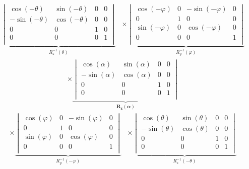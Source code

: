 \documentclass[a4paper]{article}
\theoremstyle{hangindent}
\theoremstyle{hangindent}
\begin{document}
\begin{align*}
    \underbrace{
        \begin{vmatrix}
            \cos(-\theta)  & \sin(-\theta) & 0 & 0 \\
            -\sin(-\theta) & \cos(-\theta) & 0 & 0 \\
            0              & 0             & 1 & 0 \\
            0              & 0             & 0 & 1 \\
        \end{vmatrix}
    }_{R^{-1}_z(\theta)}
    &
    \times
    \underbrace{
        \begin{vmatrix}
            \cos(-\varphi) & 0 & -\sin(-\varphi) & 0 \\
            0              & 1 & 0               & 0 \\
            \sin(-\varphi) & 0 & \cos(-\varphi)  & 0 \\
            0              & 0 & 0               & 1 \\
        \end{vmatrix}
    }_{R^{-1}_y(\varphi)}
\end{align*}
\begin{align*}
    \times
    \underbrace{
        \begin{vmatrix}
            \cos(\alpha)  & \sin(\alpha) & 0 & 0 \\
            -\sin(\alpha) & \cos(\alpha) & 0 & 0 \\
            0             & 0            & 1 & 0 \\
            0             & 0            & 0 & 1 \\
        \end{vmatrix}
    }_{\bm{R_z(\alpha)}}
\end{align*}
\begin{align*}
    \times
    \underbrace{
        \begin{vmatrix}
            \cos(\varphi) & 0 & -\sin(\varphi) & 0 \\
            0             & 1 & 0              & 0 \\
            \sin(\varphi) & 0 & \cos(\varphi)  & 0 \\
            0             & 0 & 0              & 1 \\
        \end{vmatrix}
    }_{R^{-1}_y(-\varphi)}
    &
    \times
    \underbrace{
        \begin{vmatrix}
            \cos(\theta)  & \sin(\theta) & 0 & 0 \\
            -\sin(\theta) & \cos(\theta) & 0 & 0 \\
            0             & 0            & 1 & 0 \\
            0             & 0            & 0 & 1 \\
        \end{vmatrix}
    }_{R^{-1}_z(-\theta)}
\end{align*}
\end{document}

